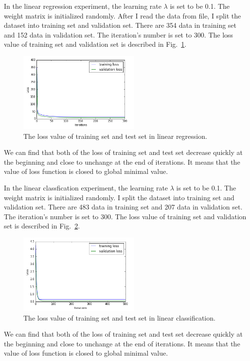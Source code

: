 \documentclass[journal, a4paper]{IEEEtran}
\begin{document}
In the linear regression experiment, the learning rate $\lambda$ is set to be 0.1. The weight matrix is initialized randomly. After I read the data from file, I split the dataset into training set and validation set. There are 354 data in training set and 152 data in validation set. The iteration's number is set to 300. The loss value of training set and validation set is described in Fig.~\ref{fig_1}.
\begin{figure}[htbp]
\centerline{\includegraphics[height=150px]{line_1.png}}
\caption{The loss value of training set and test set in linear regression.}
\label{fig_1}
\end{figure}

We can find that both of the loss of training set and test set decrease quickly at the beginning and close to unchange at the end of iterations. It means that the value of loss function is closed to global minimal value.

In the linear classfication experiment, the learning rate $\lambda$ is set to be 0.1. The weight matrix is initialized randomly. I split the dataset into training set and validation set. There are 483 data in training set and 207 data in validation set. The iteration's number is set to 300. The loss value of training set and validation set is described in Fig.~\ref{fig_2}.

\begin{figure}[htbp]
\centerline{\includegraphics[height=150px]{line_2.png}}
\caption{The loss value of training set and test set in linear classification.}
\label{fig_2}
\end{figure}

We can find that both of the loss of training set and test set decrease quickly at the beginning and close to unchange at the end of iterations. It means that the value of loss function is closed to global minimal value.
\end{document}

